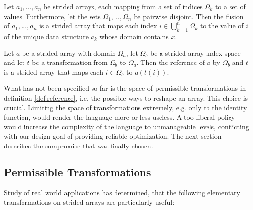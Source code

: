 \begin{define}[fusion]
  \label{def:fusion}
  Let $a_{1}, \ldots, a_{n}$ be strided arrays, each mapping from a set of
  indices $\Omega_{k}$ to a set of values.  Furthermore, let the sets
  $\Omega_{1}, \ldots, \Omega_{n}$ be pairwise disjoint. Then the fusion of
  $a_{1},\ldots, a_{n}$ is a strided array that maps each index
  $i \in \bigcup_{k=1}^{n} \Omega_{k}$ to the value of $i$ of the unique data
  structure $a_{k}$ whose domain contains $x$.
\end{define}

\begin{define}[reference]
  \label{def:reference}
  Let $a$ be a strided array with domain $\Omega_a$, let $\Omega_b$ be a
  strided array index space and let $t$ be a transformation from $\Omega_b$
  to $\Omega_a$. Then the reference of $a$ by $\Omega_b$ and $t$ is a
  strided array that maps each $i \in \Omega_b$ to $a(t(i))$.
\end{define}

What has not been specified so far is the space of permissible
transformations in definition \ref{def:reference}, i.e. the possible ways
to reshape an array. This choice is crucial. Limiting the space of
transformations extremely, e.g. only to the identity function, would render
the language more or less useless. A too liberal policy would increase the
complexity of the language to unmanageable levels, conflicting with our
design goal of providing reliable optimization. The next section describes
the compromise that was finally chosen.

\subsection{Permissible Transformations}
\label{sec:transformations}

Study of real world applications has determined, that the following
elementary transformations on strided arrays are particularly useful:

